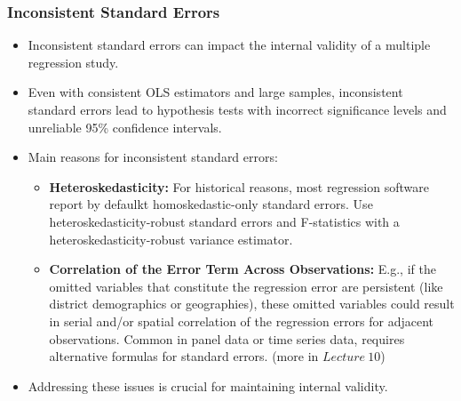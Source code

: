 \documentclass[notes,10pt, aspectratio=169]{beamer}
\begin{document}
\begin{frame}
\frametitle{Inconsistent Standard Errors}

\begin{itemize}
  \item Inconsistent standard errors can impact the internal validity of a multiple regression study.\\[1em]
  \item Even with consistent OLS estimators and large samples, inconsistent standard errors lead to hypothesis tests with incorrect significance levels and unreliable 95\% confidence intervals.\\[1em]
  \item Main reasons for inconsistent standard errors:
    \begin{itemize}
      \item \textbf{Heteroskedasticity:} For historical reasons, most regression software report by defaulkt homoskedastic-only standard errors. Use heteroskedasticity-robust standard errors and F-statistics with a heteroskedasticity-robust variance estimator.\\[.5em]
      \item \textbf{Correlation of the Error Term Across Observations:} E.g., if the omitted variables that constitute the regression error are persistent (like district demographics or geographies), these omitted variables could result in serial and/or spatial correlation of the regression errors for adjacent observations. Common in panel data or time series data, requires alternative formulas for standard errors. (more in $Lecture~10$)
    \end{itemize}
    \vspace{1em}
  \item Addressing these issues is crucial for maintaining internal validity.

\end{itemize}
\end{frame}
\end{document}

